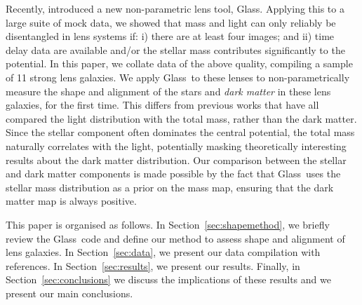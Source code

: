 \documentclass[useAMS,usenatbib]{mn2e}
\def\Glass{{\sc Glass}}
\begin{document}

Recently, \citet{2014MNRAS.445.2181C} introduced a new non-parametric lens tool, \Glass. Applying this to a large suite of mock data, we showed that mass and light can only reliably be disentangled in lens systems if: i) there are at least four images; and ii) time delay data are available and/or the stellar mass contributes significantly to the potential. In this paper, we collate data of the above quality, compiling a sample of 11 strong lens galaxies. We apply \Glass\ to these lenses to non-parametrically measure the shape and alignment of the stars and {\it dark matter} in these lens galaxies, for the first time. This differs from previous works that have all compared the light distribution with the total mass, rather than the dark matter. Since the stellar component often dominates the central potential, the total mass naturally correlates with the light, potentially masking theoretically interesting results about the dark matter distribution. Our comparison between the stellar and dark matter components is made possible by the fact that \Glass\ uses the stellar mass distribution as a prior on the mass map, ensuring that the dark matter map is always positive.

This paper is organised as follows. In Section~\ref{sec:shapemethod}, we briefly review the \Glass\ code and define our method to assess shape and alignment of lens galaxies. In Section~\ref{sec:data}, we present our data compilation with references. In Section~\ref{sec:results}, we present our results. Finally, in Section~\ref{sec:conclusions} we discuss the implications of these results and we present our main conclusions.
\end{document}
